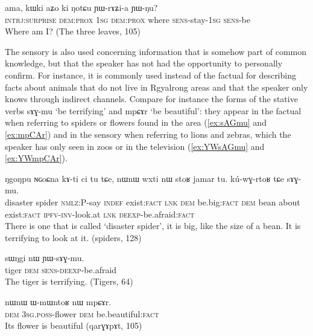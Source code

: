 \documentclass[oldfontcommands,oneside,a4paper,11pt]{article}
\newcommand{\ipa}[1]{{\phon \mbox{#1}}} %
\newcommand{\factual}[1]{\textsc{:fact}}
\begin{document}
\begin{exe}
\ex \label{ex:YWrAZia}
\gll 
\ipa{ama,}  	\ipa{kɯki}  	\ipa{aʑo}  	\ipa{ki}  	\ipa{ŋotɕu}  	\ipa{ɲɯ-rɤʑi-a}  	\ipa{ɲɯ-ŋu?}  \\
\textsc{intrj:surprise} \textsc{dem:prox} \textsc{1sg} \textsc{dem:prox} where \textsc{sens}-stay-\textsc{1sg} \textsc{sens}-be \\
\glt Where am I? (The three leaves, 105)
\end{exe}


The sensory is also used concerning information that is somehow part of common knowledge, but that the speaker has not had the opportunity to personally confirm. For instance, it is commonly used instead of the factual for describing facts about animals that do not live in Rgyalrong areas and that the speaker only knows through indirect channels. Compare for instance the forms of the stative verbs \ipa{sɤɣ-mu} `be terrifying' and \ipa{mpɕɤr} `be beautiful': they appear in the factual when referring to  spiders or flowers found in the area (\ref{ex:sAGmu} and \ref{ex:mpCAr}) and in the sensory when referring to lions and zebras, which the speaker has only seen in zoos or in the television  (\ref{ex:YWsAGmu} and \ref{ex:YWmpCAr}).

 
 
 \begin{exe}
\ex \label{ex:sAGmu}
\gll 
\ipa{ŋgoŋpu}  	\ipa{ɴɢoɕna}  	\ipa{kɤ-ti}  	\ipa{ci}  	\ipa{tu}  	\ipa{tɕe,}  	\ipa{nɯnɯ}  	\ipa{wxti}  	\ipa{nɯ}  	\ipa{stoʁ}  	\ipa{jamar}  	\ipa{tu.}  	\ipa{kú-wɣ-rtoʁ}  	\ipa{tɕe}  	\ipa{sɤɣ-mu.}  \\
disaster spider \textsc{nmlz}:P-say \textsc{indef} exist\factual{} \textsc{lnk} \textsc{dem} be.big\factual{} \textsc{dem} bean about exist\factual{} \textsc{ipfv-inv}-look.at \textsc{lnk} \textsc{deexp}-be.afraid\factual{}  \\
\glt There is one that is  called `disaster spider', it is big, like the size of a bean. It is terrifying to look at it. (spiders, 128)
\end{exe}

\begin{exe}
\ex \label{ex:YWsAGmu}
\gll 
\ipa{sɯŋgi}  	\ipa{nɯ}  	\ipa{ɲɯ-sɤɣ-mu.}  \\
tiger \textsc{dem} \textsc{sens-deexp}-be.afraid \\
\glt The tiger  is terrifying. (Tigers, 64)
\end{exe}


\begin{exe}
\ex \label{ex:mpCAr}
\gll
\ipa{nɯnɯ}  	\ipa{ɯ-mɯntoʁ}  	\ipa{nɯ}  	\ipa{mpɕɤr.}  \\
\textsc{dem} \textsc{3sg.poss}-flower \textsc{dem} be.beautiful\factual{} \\
\glt Its flower is beautiful (\ipa{qarɣɤpɤt}, 105)
\end{exe}
\end{document}
